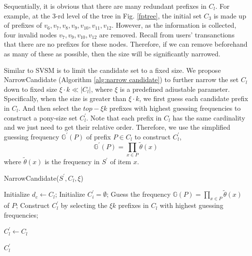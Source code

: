 \documentclass[conference]{IEEEtran}
\begin{document}
Sequentially, it is obvious that there are many redundant prefixes in $C_l$. For example, at the 3-rd level of the tree in Fig. \ref{fptree}, the initial set $C_3$ is made up of prefixes of $v_6,v_7,v_8,v_9,v_{10},v_{11},v_{12}$. However, as the information is collected, four invalid nodes $v_7,v_9,v_{10},v_{12}$ are removed. Recall from users' transanctions that there are no prefixes for these nodes. Therefore, if we can remove beforehand as many of these as possible, then the size will be significantly narrowed.

Similar to SVSM\cite{a2} is to limit the candidate set to a fixed size. We propose NarrowCandidate (Algorithm \ref{alg:narrow candidate}) to further narrow the set $C_l$ down to fixed size $\xi \cdot k \ll |C_l|$, where $\xi$ is a predefined adiustable parameter. Specifically, when the size is greater than $\xi \cdot k$, we first guess each candidate prefix in $C_l$. And then select the $top-\xi k$ prefixes with highest guessing frequencies to construct a pony-size set $C^{\prime}_{l}$. Note that each prefix in $C_l$ has the same cardinality and we just need to get their relative order. Therefore, we use the simplified guessing frequency $\mathbb{G}^{\prime}(P)$ of prefix $P \in C_l$ to construct $C^{\prime}_{l}$,
\begin{equation}
\mathbb{G}^{\prime}(P)=\prod_{x \in P} \tilde{\theta}(x) \label{simply gf}
\end{equation}
where $\tilde{\theta}(x)$ is the frequency in $S^{\prime}$ of item $x$.


\begin{algorithm}[]
\caption{NarrowCandidate($S^{\prime},C_l,\xi$)}
\label{alg:narrow candidate}
\begin{algorithmic}[1]

\STATE Initialize $d_c \gets C_l$;
\STATE Initialize $C^{\prime}_{i} = \emptyset$;
    \STATE Guess the frequency $\mathbb{G}(P)=\prod_{x \in P} \tilde{\theta}(x)$ of $P$;        
  \ENDFOR
  \STATE Construct $C^{\prime}_{l}$ by selecting the $\xi k$ prefixes in $C_l$ with highest guessing frequencies;

\ELSE
  \STATE $C^{\prime}_{l} \gets C_l$

\ENDIF 

\RETURN $C^{\prime}_{l}$
\end{algorithmic}
\end{algorithm}
\end{document}
